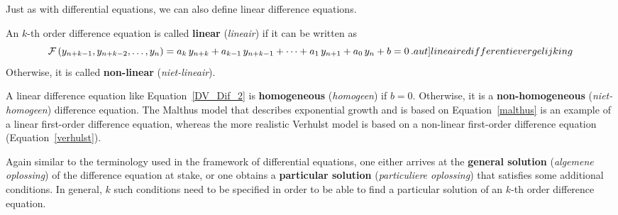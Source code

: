 Just as with differential equations, we can also define linear difference equations. 
\begin{definition} 
An $k$-th order difference equation is called \textbf{linear} (\textit{lineair}) if it can be written as
\begin{equation}
\mathcal{F}\left(y_{n+k-1},y_{n+k-2},\ldots,y_{n}\right)=a_k\,y_{n+k}+a_{k-1}\,y_{n+k-1}+\cdots+a_1\,y_{n+1}+a_0\,y_n+b=0\,.
\index{linear difference equation} \index[aut]{lineaire differentievergelijking}
\label{DV_Dif_2}
\end{equation}
Otherwise, it is called \textbf{non-linear} (\textit{niet-lineair}). 
\end{definition}
A linear difference equation like Equation~\eqref{DV_Dif_2} is \textbf{homogeneous} (\textit{homogeen}) if $b=0$. Otherwise, it is a \textbf{non-homogeneous} (\textit{niet-homogeen}) difference equation. The Malthus model that describes exponential growth and is based on Equation~\eqref{malthus} is an example of a linear first-order difference equation, whereas the more realistic Verhulst model is based on a non-linear first-order difference equation (Equation~\eqref{verhulst}).    

Again similar to the terminology used in the framework of differential equations, one either arrives at the \textbf{general solution} (\textit{algemene oplossing}) of the difference equation at stake, or one obtains a \textbf{particular solution} (\textit{particuliere oplossing}) that satisfies some additional conditions. In general, $k$ such conditions need to be specified in order to be able to find a particular solution of an $k$-th order difference equation.  

